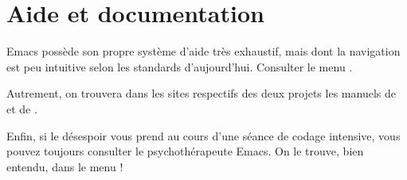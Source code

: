 

\section{Aide et documentation}
\label{sec:emacs+ess:aide}

Emacs possède son propre système d'aide très exhaustif, mais dont la
navigation est peu intuitive selon les standards d'aujourd'hui.
Consulter le menu .

Autrement, on trouvera dans les sites respectifs des deux projets les
manuels de  et de
.

Enfin, si le désespoir vous prend au cours d'une séance de codage
intensive, vous pouvez toujours consulter le psychothérapeute Emacs.
On le trouve, bien entendu, dans le menu !


